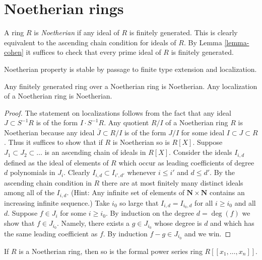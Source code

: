 \section{Noetherian rings}
\label{section-Noetherian}

\noindent
A ring $R$ is {\it Noetherian} if any ideal of $R$ is finitely generated.
This is clearly equivalent to the ascending chain condition for ideals of $R$.
By
Lemma \ref{lemma-cohen}
it suffices to check that every prime ideal of $R$ is finitely generated.

\begin{lemma}
\label{lemma-Noetherian-permanence}
\begin{slogan}
Noetherian property is stable by passage to finite type extension
and localization.
\end{slogan}
Any finitely generated ring over a Noetherian ring
is Noetherian. Any localization of a Noetherian ring
is Noetherian.
\end{lemma}

\begin{proof}
The statement on localizations follows from the fact
that any ideal $J \subset S^{-1}R$ is of the form
$I \cdot S^{-1}R$. Any quotient $R/I$ of a Noetherian
ring $R$ is Noetherian because any ideal $\overline{J} \subset R/I$
is of the form $J/I$ for some ideal $I \subset J \subset R$.
Thus it suffices to show that if $R$ is Noetherian so
is $R[X]$. Suppose $J_1 \subset J_2 \subset \ldots$ is an
ascending chain of ideals in $R[X]$. Consider the ideals $I_{i, d}$
defined as the ideal of elements of $R$ which occur as leading
coefficients of degree $d$ polynomials in $J_i$.
Clearly $I_{i, d} \subset I_{i', d'}$ whenever
$i \leq i'$ and $d \leq d'$. By the ascending chain condition
in $R$ there are at most finitely many distinct ideals among all of
the $I_{i, d}$.
(Hint: Any infinite set of elements of
$\mathbf{N} \times \mathbf{N}$ contains an increasing
infinite sequence.)
Take $i_0$ so large that $I_{i, d} = I_{i_0, d}$
for all $i \geq i_0$ and all $d$. Suppose $f \in J_i$ for some $i \geq i_0$.
By induction on the degree $d = \deg(f)$ we show that $f \in J_{i_0}$.
Namely, there exists a $g\in J_{i_0}$ whose degree is $d$ and which
has the same leading coefficient as $f$. By induction
$f - g \in J_{i_0}$ and we win.
\end{proof}

\begin{lemma}
\label{lemma-Noetherian-power-series}
If $R$ is a Noetherian ring, then so is the formal power
series ring $R[[x_1, \ldots, x_n]]$.
\end{lemma}

